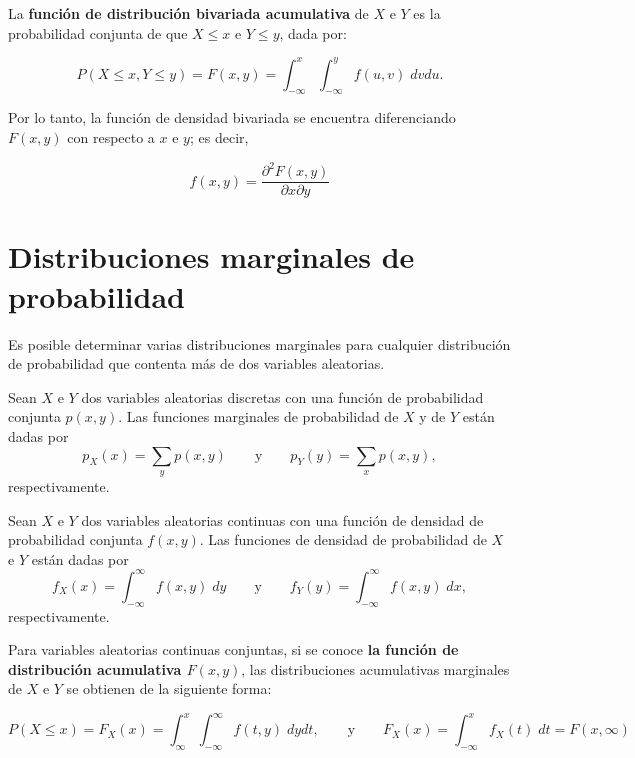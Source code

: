 La \textbf{función de distribución bivariada acumulativa} de $X$ e $Y$ es la probabilidad conjunta de que $X\leq x$ e $Y\leq y$, dada por:
\begin{tcolorbox}
    $$P(X\leq x, Y\leq y)=F(x,y)=\int_{-\infty}^x \int_{-\infty}^y f(u,v)\; dvdu.$$
\end{tcolorbox}
Por lo tanto, la función de densidad bivariada se encuentra diferenciando $F(x,y)$ con respecto a $x$ e $y$; es decir,

\begin{tcolorbox}
    $$f(x,y)=\dfrac{\partial^2 F(x,y)}{\partial x \partial y}$$
\end{tcolorbox}


\section{Distribuciones marginales de probabilidad}
Es posible determinar varias distribuciones marginales para cualquier distribución de probabilidad que contenta más de dos variables aleatorias.

\begin{tcolorbox}
    \begin{def.}
	Sean $X$ e $Y$ dos variables aleatorias discretas con una función de probabilidad conjunta $p(x,y)$. Las funciones marginales de probabilidad de $X$ y de $Y$ están dadas por
	$$p_X(x)=\sum_y p(x,y)\qquad \mbox{y}\qquad p_Y(y)=\sum_x p(x,y),$$
	respectivamente.
    \end{def.}
\end{tcolorbox}

\begin{tcolorbox}
    \begin{def.}
	Sean $X$ e $Y$ dos variables aleatorias continuas con una función de densidad de probabilidad conjunta $f(x,y)$. Las funciones de densidad de probabilidad de $X$ e $Y$ están dadas por
	$$f_X(x)=\int_{-\infty}^\infty f(x,y)\; dy \qquad \mbox{y} \qquad f_Y(y)=\int_{-\infty}^\infty f(x,y)\; dx,$$
	respectivamente.
    \end{def.}
\end{tcolorbox}

Para variables aleatorias continuas conjuntas, si se conoce \textbf{\boldmath la función de distribución acumulativa $F(x,y)$}, las distribuciones acumulativas marginales de $X$ e $Y$ se obtienen de la siguiente forma:

\begin{tcolorbox}
    $$P(X\leq x)=F_X(x)=\int_{\infty}^x \int_{-\infty}^\infty f(t,y)\; dydt,\qquad \mbox{y}\qquad F_X(x)=\int_{-\infty}^x f_X(t)\; dt = F(x,\infty)$$
\end{tcolorbox}

